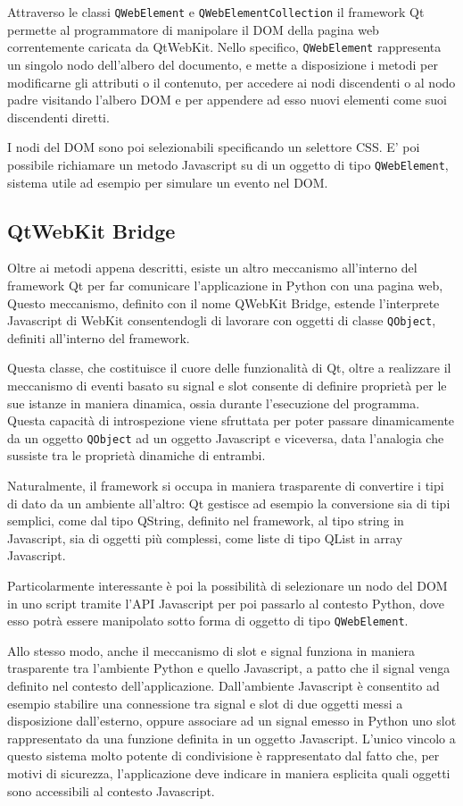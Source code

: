 Attraverso le classi \verb|QWebElement| e \verb|QWebElementCollection| il framework Qt permette al programmatore di manipolare il DOM della pagina web correntemente caricata da QtWebKit. Nello specifico, \verb|QWebElement| rappresenta un singolo nodo dell'albero del documento, e mette a disposizione i metodi per modificarne gli attributi o il contenuto, per accedere ai nodi discendenti o al nodo padre visitando l'albero DOM e per appendere ad esso nuovi elementi come suoi discendenti diretti.

I nodi del DOM sono poi selezionabili specificando un selettore CSS. E' poi possibile richiamare un metodo Javascript su di un oggetto di tipo \verb|QWebElement|, sistema utile ad esempio per simulare un evento nel DOM.

\subsection{QtWebKit Bridge}

Oltre ai metodi appena descritti, esiste un altro meccanismo all'interno del framework Qt per far comunicare l'applicazione in Python con una pagina web, Questo meccanismo, definito con il nome QWebKit  Bridge, estende l'interprete Javascript di WebKit consentendogli di lavorare con oggetti di classe \verb|QObject|, definiti all'interno del framework. 

Questa classe, che costituisce il cuore delle funzionalità di Qt, oltre a realizzare il meccanismo di eventi basato su signal e slot consente di definire proprietà per le sue istanze in maniera dinamica, ossia durante l'esecuzione del programma. Questa capacità di introspezione viene sfruttata per poter passare dinamicamente da un oggetto \verb|QObject| ad un oggetto Javascript e viceversa, data l'analogia che sussiste tra le proprietà dinamiche di entrambi. 

Naturalmente, il framework si occupa in maniera trasparente di convertire i tipi di dato da un ambiente all'altro: Qt gestisce ad esempio la conversione sia di tipi semplici, come dal tipo QString, definito nel framework, al tipo string in Javascript, sia di oggetti più complessi, come liste di tipo QList in array Javascript.

Particolarmente interessante è poi la possibilità di selezionare un nodo del DOM in uno script tramite l'API Javascript per poi passarlo al contesto Python, dove esso potrà essere manipolato sotto forma di oggetto di tipo \verb|QWebElement|. 

Allo stesso modo, anche il meccanismo di slot e signal funziona in maniera trasparente tra l'ambiente Python e quello Javascript, a patto che il signal venga definito nel contesto dell'applicazione. Dall'ambiente Javascript è consentito ad esempio stabilire una connessione tra signal e slot di due oggetti messi a disposizione dall'esterno, oppure associare ad un signal emesso in Python uno slot rappresentato da una funzione definita in un oggetto Javascript. L'unico vincolo a questo sistema molto potente di condivisione è rappresentato dal fatto che, per motivi di sicurezza, l'applicazione deve indicare in maniera esplicita quali oggetti sono accessibili al contesto Javascript.

